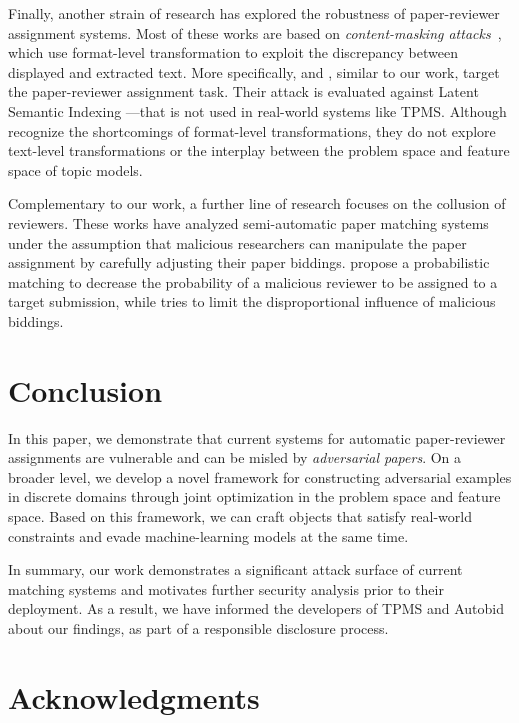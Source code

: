 \documentclass[letterpaper,twocolumn,10pt]{article}
\begin{document}
Finally, another {strain\EndAccSupp{}} of research has explored the robustness of paper-reviewer assignment systems. 
Most of these works are based on \emph{content-masking attacks}~\cite{markwood-17-pdf, tran-19-pdfphantom}, which use format-level transformation to exploit the discrepancy between displayed and extracted text.
More specifically, \citet{markwood-17-pdf} and \citet{tran-19-pdfphantom}, similar to our work, target the paper-reviewer assignment task.
Their attack is evaluated against Latent Semantic Indexing \cite{deerwester-90-indexing}---that is not used in real-world systems like TPMS. 
Although \citet{tran-19-pdfphantom} recognize the shortcomings of format-level transformations, they do not explore text-level transformations or the {interplay\EndAccSupp{}} between the problem space and feature space of topic models. 

Complementary to our work, a further line of research focuses on the {collusion\EndAccSupp{}} of reviewers. These works have analyzed semi-automatic paper matching systems under the assumption that malicious researchers can manipulate the paper assignment by carefully adjusting their paper biddings.
\citet{jecmen-20-mitigating} propose a probabilistic matching to decrease the probability of a malicious reviewer to be assigned to a target submission, while \citet{wu-21-making} tries to limit the disproportional influence of malicious biddings.
 \section{Conclusion}
\label{sec:conclusion}

In this paper, we demonstrate that current systems for automatic paper-reviewer assignments are vulnerable and can be misled by \emph{adversarial papers}. On a broader level, we develop a novel framework for constructing adversarial examples in discrete domains through joint optimization in the problem space and feature space. Based on this framework, we can craft objects that satisfy real-world constraints and evade machine-learning models at the same time.

In summary, our work demonstrates a significant attack surface of current matching systems and motivates further security analysis prior to their deployment. As a result, we have informed the developers of TPMS and Autobid about our findings, as part of a responsible disclosure process.
 \clearpage
\section*{Acknowledgments}
\end{document}
